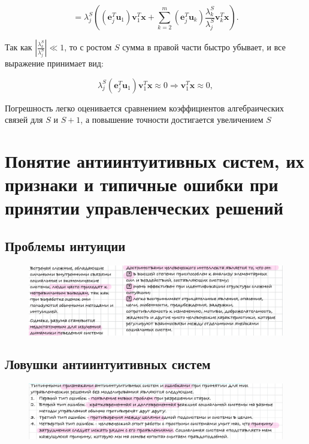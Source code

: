 	\[
	= \lambda_j^S \left( \left( \mathbf{e}_j^T \mathbf{u}_1 \right) \mathbf{v}_1^T \mathbf{x} + \sum_{k=2}^{m} \left( \mathbf{e}_j^T \mathbf{u}_k \right) \frac{\lambda_k^S}{\lambda_j^S} \mathbf{v}_k^T \mathbf{x} \right).
	\]
	
	Так как $\left| \frac{\lambda_k^S}{\lambda_j^S} \right| \ll 1$, то с ростом $S$ сумма в правой части быстро убывает, и все выражение принимает вид:
	
	\begin{equation}
		\lambda_j^S \left( \mathbf{e}_j^T \mathbf{u}_1 \right) \mathbf{v}_1^T \mathbf{x} \approx 0 \Rightarrow \mathbf{v}_1^T \mathbf{x} \approx 0,
	\end{equation}
	
	Погрешность легко оценивается сравнением коэффициентов алгебраических связей для $S$ и $S+1$, а повышение точности достигается увеличением $S$
	
	\newpage
	
	\section{Понятие антиинтуитивных систем, их признаки и типичные ошибки при принятии управленческих решений}
	
	\subsection{Проблемы интуиции}
	\vspace{-1em}
	\begin{figure}[H]
		\centering
		\includegraphics[width=1\linewidth, height=0.2\textheight]{img/30_01}
		\label{fig:30_01}
	\end{figure}
	\vspace{-1em}
	\subsection{Ловушки антиинтуитивных систем}
	\vspace{-1em}
	\begin{figure}[H]
		\centering
		\includegraphics[width=1\linewidth, height=0.2\textheight]{img/30_02}
		\label{fig:30_02}
	\end{figure}
	\vspace{-1em}
